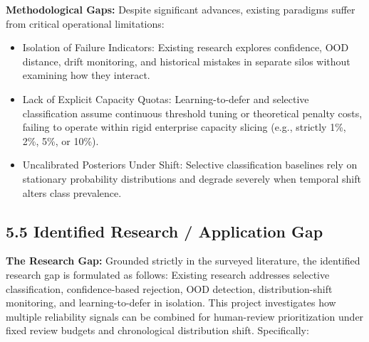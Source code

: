 \textbf{Methodological Gaps:} Despite significant advances, existing paradigms suffer from critical operational limitations:

\begin{itemize}
\item Isolation of Failure Indicators: Existing research explores confidence, OOD distance, drift monitoring, and historical mistakes in separate silos without examining how they interact.
\item Lack of Explicit Capacity Quotas: Learning-to-defer and selective classification assume continuous threshold tuning or theoretical penalty costs, failing to operate within rigid enterprise capacity slicing (e.g., strictly 1\%, 2\%, 5\%, or 10\%).
\item Uncalibrated Posteriors Under Shift: Selective classification baselines rely on stationary probability distributions and degrade severely when temporal shift alters class prevalence.
\end{itemize}

\subsection{5.5 Identified Research / Application Gap}

\textbf{The Research Gap:} Grounded strictly in the surveyed literature, the identified research gap is formulated as follows: Existing research addresses selective classification, confidence-based rejection, OOD detection, distribution-shift monitoring, and learning-to-defer in isolation. This project investigates how multiple reliability signals can be combined for human-review prioritization under fixed review budgets and chronological distribution shift. Specifically:

